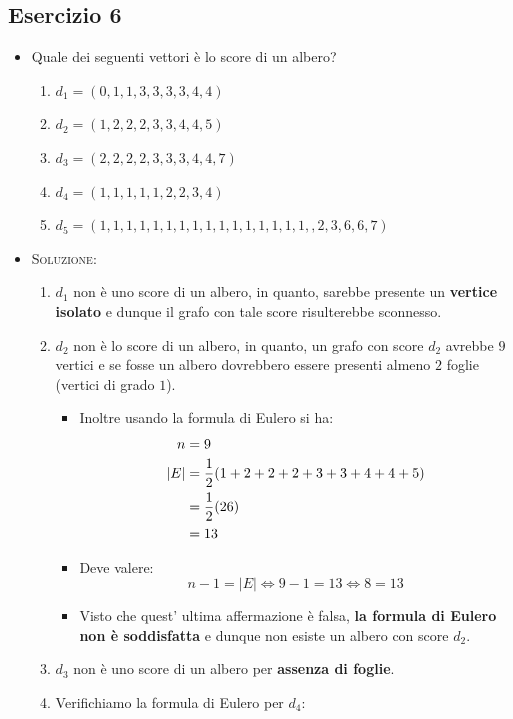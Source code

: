 \documentclass[10pt]{article}
\begin{document}
	\subsection{Esercizio 6}
	\begin{itemize}
	\item
	Quale dei seguenti vettori è lo score di un albero?
	\begin{enumerate}
	\item
	$d_1 = (0,1,1,3,3,3,3,4,4)$
	\item
	$d_2 = (1,2,2,2,3,3,4,4,5)$
	\item
	$d_3 = (2,2,2,2,3,3,3,4,4,7)$
	\item
	$d_4 = (1,1,1,1,1,2,2,3,4)$
	\item
	$d_5 = (1,1,1,1,1,1,1,1,1,1,1,1,1,1,1,1,,2,3,6,6,7)$
	\end{enumerate}
	\item
	\textsc{Soluzione:}
	\begin{enumerate}
	\item
	$d_1$ non è uno score di un albero, in quanto, sarebbe presente un \textbf{vertice isolato} e dunque il grafo con tale score risulterebbe sconnesso.
	\item
	$d_2$ non è lo score di un albero, in quanto, un grafo con score $d_2$ avrebbe $9$ vertici e se fosse un albero dovrebbero essere presenti almeno $2$ foglie (vertici di grado $1$).
	\begin{itemize}
	\item
	Inoltre usando la formula di Eulero si ha:	
	\begin{equation}
	\begin{split}
	n &= 9 \textrm{\smallskip\smallskip}\\
	|E| &= \frac{1}{2} (1+2+2+2+3+3+4+4+5)\\
	&= \frac{1}{2}(26) \\
	&= 13
	\notag
	\end{split}
	\end{equation}
	\item
	Deve valere: $$n-1 = |E| \Longleftrightarrow 9 - 1 = 13 \Longleftrightarrow 8 = 13$$
	\item
	Visto che quest' ultima affermazione è falsa, \textbf{la formula di Eulero non è soddisfatta} e dunque non esiste un albero con score $d_2$.	
	\end{itemize}
	\item
	$d_3$ non è uno score di un albero per \textbf{assenza di foglie}.
	\item
	Verifichiamo la formula di Eulero per $d_4$:

\end{enumerate}
\end{itemize}
\end{document}
